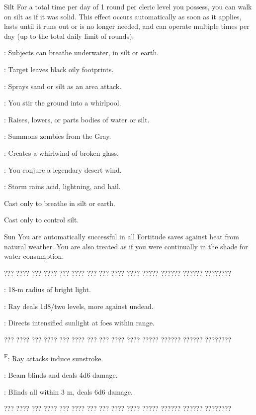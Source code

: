 {Silt}
{For a total time per day of 1 round per cleric level you possess, you can walk on silt as if it was solid. This effect occurs automatically as soon as it applies, lasts until it runs out or is no longer needed, and can operate multiple times per day (up to the total daily limit of rounds).}
{
	\item {}\footnotemark[1]: Subjects can breathe underwater, in silt or earth.
	\item {}: Target leaves black oily footprints.
	\item {}: Sprays sand or silt as an area attack.
	\item {}: You stir the ground into a whirlpool.
	\item {}\footnotemark[2]: Raises, lowers, or parts bodies of water or silt.
	\item {}: Summons zombies from the Gray.
	\item {}: Creates a whirlwind of broken glass.
	\item {}: You conjure a legendary desert wind.
	\item {}: Storm rains acid, lightning, and hail.
}
 Cast only to breathe in silt or earth.

 Cast only to control silt.

{Sun}
{You are automatically successful in all Fortitude saves against heat from natural weather. You are also treated as if you were continually in the shade for water consumption.}
{
	\item ??? ???? ??? ???? ??? ???? ??? ??? ???? ???? ????? ?????? ?????? ????????
	\item {}: 18-m radius of bright light.
	\item {}: Ray deals 1d8/two levels, more against undead.
	\item {}: Directs intensified sunlight at foes within range.
	\item ??? ???? ??? ???? ??? ???? ??? ??? ???? ???? ????? ?????? ?????? ????????
	\item {}\textsuperscript{F}: Ray attacks induce sunstroke.
	\item {}: Beam blinds and deals 4d6 damage.
	\item {}: Blinds all within 3 m, deals 6d6 damage.
	\item ??? ???? ??? ???? ??? ???? ??? ??? ???? ???? ????? ?????? ?????? ????????
}

